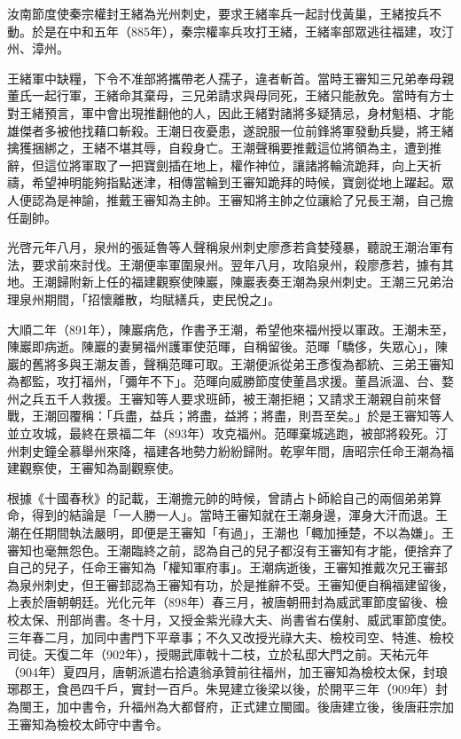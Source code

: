 汝南節度使秦宗權封王緒為光州刺史，要求王緒率兵一起討伐黃巢，王緒按兵不動。於是在中和五年（885年），秦宗權率兵攻打王緒，王緒率部眾逃往福建，攻汀州、漳州。

王緒軍中缺糧，下令不准部將攜帶老人孺子，違者斬首。當時王審知三兄弟奉母親董氏一起行軍，王緒命其棄母，三兄弟請求與母同死，王緒只能赦免。當時有方士對王緒預言，軍中會出現推翻他的人，因此王緒對諸將多疑猜忌，身材魁梧、才能雄傑者多被他找藉口斬殺。王潮日夜憂患，遂說服一位前鋒將軍發動兵變，將王緒擒獲捆綁之，王緒不堪其辱，自殺身亡。王潮聲稱要推戴這位將領為主，遭到推辭，但這位將軍取了一把寶劍插在地上，權作神位，讓諸將輪流跪拜，向上天祈禱，希望神明能夠指點迷津，相傳當輪到王審知跪拜的時候，寶劍從地上躍起。眾人便認為是神諭，推戴王審知為主帥。王審知將主帥之位讓給了兄長王潮，自己擔任副帥。

光啓元年八月，泉州的張延魯等人聲稱泉州刺史廖彥若貪婪殘暴，聽說王潮治軍有法，要求前來討伐。王潮便率軍圍泉州。翌年八月，攻陷泉州，殺廖彥若，據有其地。王潮歸附新上任的福建觀察使陳巖，陳巖表奏王潮為泉州刺史。王潮三兄弟治理泉州期間，「招懷離散，均賦繕兵，吏民悅之」。

大順二年（891年），陳巖病危，作書予王潮，希望他來福州授以軍政。王潮未至，陳巖即病逝。陳巖的妻舅福州護軍使范暉，自稱留後。范暉「驕侈，失眾心」，陳巖的舊將多與王潮友善，聲稱范暉可取。王潮便派從弟王彥復為都統、三弟王審知為都監，攻打福州，「彌年不下」。范暉向威勝節度使董昌求援。董昌派溫、台、婺州之兵五千人救援。王審知等人要求班師，被王潮拒絕；又請求王潮親自前來督戰，王潮回覆稱：「兵盡，益兵；將盡，益將；將盡，則吾至矣。」於是王審知等人並立攻城，最終在景福二年（893年）攻克福州。范暉棄城逃跑，被部將殺死。汀州刺史鐘全慕舉州來降，福建各地勢力紛紛歸附。乾寧年間，唐昭宗任命王潮為福建觀察使，王審知為副觀察使。

根據《十國春秋》的記載，王潮擔元帥的時候，曾請占卜師給自己的兩個弟弟算命，得到的結論是「一人勝一人」。當時王審知就在王潮身邊，渾身大汗而退。王潮在任期間執法嚴明，即便是王審知「有過」，王潮也「輙加捶楚，不以為嫌」。王審知也毫無怨色。王潮臨終之前，認為自己的兒子都沒有王審知有才能，便捨弃了自己的兒子，任命王審知為「權知軍府事」。王潮病逝後，王審知推戴次兄王審邽為泉州刺史，但王審邽認為王審知有功，於是推辭不受。王審知便自稱福建留後，上表於唐朝朝廷。光化元年（898年）春三月，被唐朝冊封為威武軍節度留後、檢校太保、刑部尚書。冬十月，又授金紫光祿大夫、尚書省右僕射、威武軍節度使。三年春二月，加同中書門下平章事；不久又改授光祿大夫、檢校司空、特進、檢校司徒。天復二年（902年），授賜武庫戟十二枝，立於私邸大門之前。天祐元年（904年）夏四月，唐朝派遣右拾遺翁承贊前往福州，加王審知為檢校太保，封琅琊郡王，食邑四千戶，實封一百戶。朱晃建立後梁以後，於開平三年（909年）封為閩王，加中書令，升福州為大都督府，正式建立閩國。後唐建立後，後唐莊宗加王審知為檢校太師守中書令。

